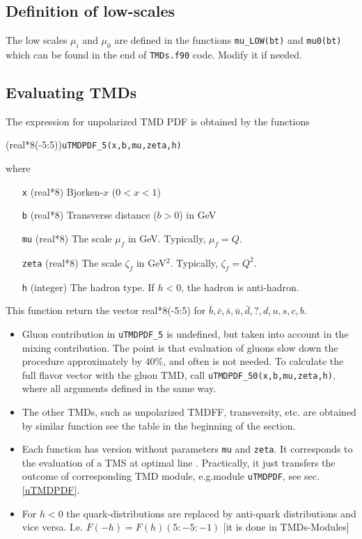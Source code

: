 \documentclass[prd,nofootinbib,eqsecnum,final]{revtex4}
\renewcommand{\(}{\left(}
\renewcommand{\)}{\right)}
\renewcommand{\[}{\left[}
\renewcommand{\]}{\right]}
\begin{document}
\subsection{Definition of low-scales}
\label{TMDs:mus}

The low scales $\mu_i$ and $\mu_0$ are defined in the functions \texttt{mu{\_}LOW(bt)} and \texttt{mu0(bt)} which can be found in the end of \texttt{TMDs.f90} code. Modify it if needed.



\subsection{Evaluating TMDs}
\label{TMDs:TMDs}

The expression for unpolarized TMD PDF is obtained by the functions

(real*8(-5:5))\texttt{uTMDPDF{\_}5(x,b,mu,zeta,h)}

where 
\begin{itemize}
\item [\texttt{x}] (real*8) Bjorken-$x$ ($0<x<1$)
\item [\texttt{b}] (real*8) Transverse distance ($b>0$) in GeV
\item [\texttt{mu}] (real*8) The scale $\mu_f$ in GeV. Typically, $\mu_f=Q$.
\item [\texttt{zeta}] (real*8) The scale $\zeta_f$ in GeV$^2$. Typically, $\zeta_f=Q^2$.
\item [\texttt{h}] (integer) The hadron type. If $h<0$, the hadron is anti-hadron.
\end{itemize}
This function return the vector real*8(-5:5) for $\bar b, \bar c, \bar s,\bar u,\bar d ,?,d,u,s, c, b$.

\begin{itemize}
\item Gluon contribution in \texttt{uTMDPDF{\_}5} is undefined, but taken into account in the mixing contribution. The point is that evaluation of gluons slow down the procedure approximately by $40\%$, and often is not needed. To calculate the full flavor vector with the gluon TMD, call \texttt{uTMDPDF{\_}50(x,b,mu,zeta,h)}, where all arguments defined in the same way.

\item The other TMDs, such as unpolarized TMDFF, transversity, etc. are obtained by similar function see the table in the beginning of the section.

\item Each function has version without parameters \texttt{mu} and \texttt{zeta}. It corresponds to the evaluation of a TMS at optimal line \cite{Scimemi:2018xaf}. Practically, it just transfers the outcome of corresponding TMD module, e.g.module \texttt{uTMDPDF}, see sec.\ref{uTMDPDF}.

\item For $h<0$ the quark-distributions are replaced by anti-quark distributions and vice versa. I.e. $F(-h)=F(h)(5:-5:-1)$ [it is done in TMDs-Modules]
\end{itemize}
\end{document}
